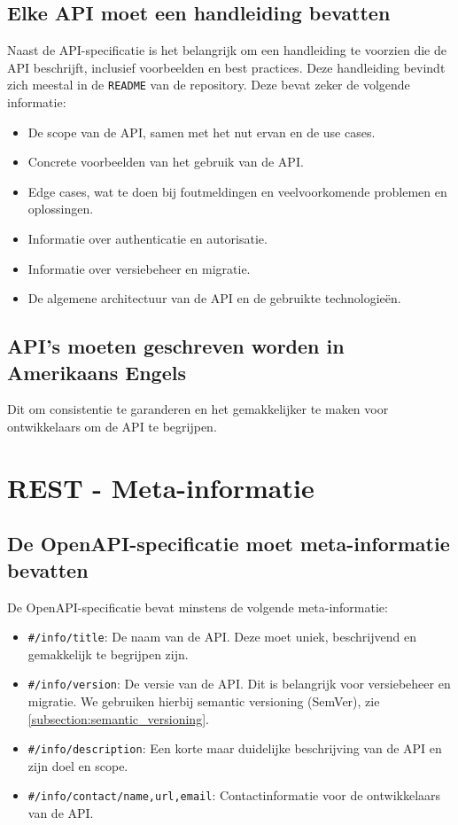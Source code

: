 \subsection{Elke API moet een handleiding bevatten}
\label{section:api_handleiding}

Naast de API-specificatie is het belangrijk om een handleiding te voorzien die de API beschrijft, inclusief voorbeelden en best practices. Deze handleiding bevindt zich meestal in de \texttt{README} van de repository. Deze bevat zeker de volgende informatie:

\begin{itemize}
    \item De scope van de API, samen met het nut ervan en de use cases.
    \item Concrete voorbeelden van het gebruik van de API.
    \item Edge cases, wat te doen bij foutmeldingen en veelvoorkomende problemen en oplossingen.
    \item Informatie over authenticatie en autorisatie.
    \item Informatie over versiebeheer en migratie.
    \item De algemene architectuur van de API en de gebruikte technologieën.
\end{itemize}

\subsection{API's moeten geschreven worden in Amerikaans Engels}
\label{section:amerikaans_engels}

Dit om consistentie te garanderen en het gemakkelijker te maken voor ontwikkelaars om de API te begrijpen.

\section{REST - Meta-informatie}

\subsection{De OpenAPI-specificatie moet meta-informatie bevatten}
\label{section:openapi_meta_informatie}

De OpenAPI-specificatie bevat minstens de volgende meta-informatie:

\begin{itemize}
    \item \texttt{\#/info/title}: De naam van de API. Deze moet uniek, beschrijvend en gemakkelijk te begrijpen zijn.
    \item \texttt{\#/info/version}: De versie van de API. Dit is belangrijk voor versiebeheer en migratie. We gebruiken hierbij semantic versioning (SemVer), zie \ref{subsection:semantic_versioning}.
    \item \texttt{\#/info/description}: Een korte maar duidelijke beschrijving van de API en zijn doel en scope.
    \item \texttt{\#/info/contact/{name,url,email}}: Contactinformatie voor de ontwikkelaars van de API.
\end{itemize}

